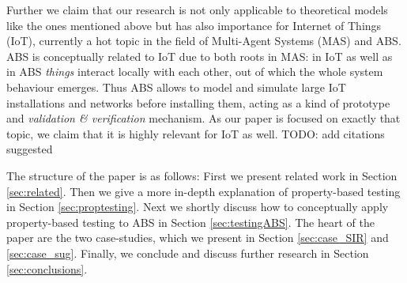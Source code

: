
Further we claim that our research is not only applicable to theoretical models like the ones mentioned above but has also importance for Internet of Things (IoT), currently a hot topic in the field of Multi-Agent Systems (MAS) and ABS. ABS is conceptually related to IoT due to both roots in MAS: in IoT as well as in ABS \textit{things} interact locally with each other, out of which the whole system behaviour emerges. Thus ABS allows to model and simulate large IoT installations and networks before installing them, acting as a kind of prototype and \textit{validation \& verification} mechanism. As our paper is focused on exactly that topic, we claim that it is highly relevant for IoT as well. TODO: add citations suggested

The structure of the paper is as follows: First we present related work in Section \ref{sec:related}. Then we give a more in-depth explanation of property-based testing in Section \ref{sec:proptesting}. Next we shortly discuss how to conceptually apply property-based testing to ABS in Section \ref{sec:testingABS}. The heart of the paper are the two case-studies, which we present in Section \ref{sec:case_SIR} and \ref{sec:case_sug}. Finally, we conclude and discuss further research in Section \ref{sec:conclusions}.